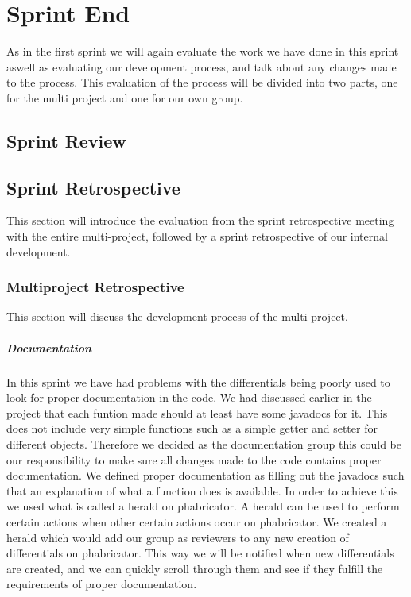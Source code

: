 \chapter{Sprint End}
As in the first sprint we will again evaluate the work we have done in this sprint aswell as evaluating our development process, and talk about any changes made to the process.
This evaluation of the process will be divided into two parts, one for the multi project and one for our own group.
\section{Sprint Review}

\section{Sprint Retrospective}
This section will introduce the evaluation from the sprint retrospective meeting with the entire multi-project, followed by a sprint retrospective of our internal development.
\subsection*{Multiproject Retrospective}
This section will discuss the development process of the multi-project.
\paragraph{Documentation}
In this sprint we have had problems with the differentials being poorly used to look for proper documentation in the code.
We had discussed earlier in the project that each funtion made should at least have some javadocs for it.
This does not include very simple functions such as a simple getter and setter for different objects.
Therefore we decided as the documentation group this could be our responsibility to make sure all changes made to the code contains proper documentation.
We defined proper documentation as filling out the javadocs such that an explanation of what a function does is available.
In order to achieve this we used what is called a herald on phabricator.
A herald can be used to perform certain actions when other certain actions occur on phabricator.
We created a herald which would add our group as reviewers to any new creation of differentials on phabricator.
This way we will be notified when new differentials are created, and we can quickly scroll through them and see if they fulfill the requirements of proper documentation.
